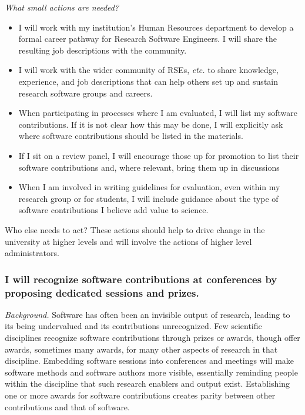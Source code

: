 \documentclass[a4paper,UKenglish]{dagman}
\renewcommand{\paragraph}[1]{\subsubsection*{#1}\xspace}
\newcommand{\etc}{\emph{etc.}\xspace}
\begin{document}
\emph{What small actions are needed?}
\begin{itemize}
\item I will work with my institution's Human Resources department to develop a formal career pathway for Research Software Engineers. I will share the resulting job descriptions with the community.
\item I will work with the wider community of RSEs, \etc to share knowledge, experience, and job descriptions that can help others set up and sustain research software groups and careers.
\item When participating in processes where I am evaluated, I will list my software contributions.
If it is not clear how this may be done, I will explicitly ask where software contributions should be listed in the materials.
\item If I sit on a review panel, I will encourage those up for promotion to list their software contributions and, where relevant, bring them up in discussions
\item When I am involved in writing guidelines for evaluation, even within my research group or for students, I will include guidance about the type of software contributions I believe add value to science. 
\end{itemize}

Who else needs to act?
These actions should help to drive change in the university at higher levels and will involve the actions of higher level administrators.

\paragraph{I will recognize software contributions at conferences by proposing dedicated sessions and prizes.}

\emph{Background.} Software has often been an invisible output of research, leading to its being undervalued and its contributions unrecognized.
Few scientific disciplines recognize software contributions through prizes or awards, though offer awards, sometimes many awards, for many other aspects of research in that discipline.
Embedding software sessions into conferences and meetings will make software methods and software authors more visible, essentially reminding people within the discipline that such research enablers and output exist.
Establishing one or more awards for software contributions creates parity between other contributions and that of software.
\end{document}
